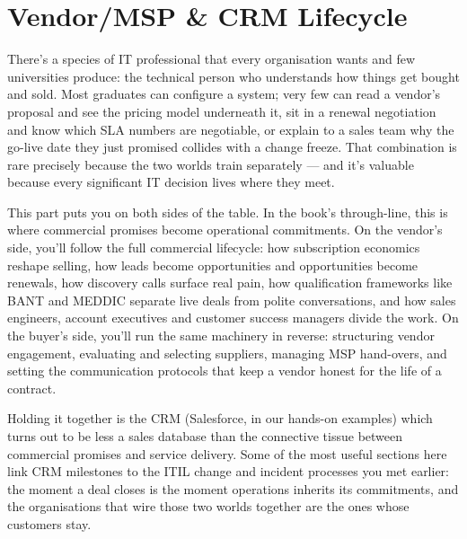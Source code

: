 
\chapter{Vendor/MSP \& CRM Lifecycle}


There's a species of IT professional that every organisation wants and few universities produce: the technical person who understands how things get bought and sold. Most graduates can configure a system; very few can read a vendor's proposal and see the pricing model underneath it, sit in a renewal negotiation and know which SLA numbers are negotiable, or explain to a sales team why the go-live date they just promised collides with a change freeze. That combination is rare precisely because the two worlds train separately — and it's valuable because every significant IT decision lives where they meet.


This part puts you on both sides of the table. In the book's through-line, this is where commercial promises become operational commitments. On the vendor's side, you'll follow the full commercial lifecycle: how subscription economics reshape selling, how leads become opportunities and opportunities become renewals, how discovery calls surface real pain, how qualification frameworks like BANT and MEDDIC separate live deals from polite conversations, and how sales engineers, account executives and customer success managers divide the work. On the buyer's side, you'll run the same machinery in reverse: structuring vendor engagement, evaluating and selecting suppliers, managing MSP hand-overs, and setting the communication protocols that keep a vendor honest for the life of a contract. \autocite{salesforce-sales-process}


Holding it together is the CRM (Salesforce, in our hands-on examples) which turns out to be less a sales database than the connective tissue between commercial promises and service delivery. Some of the most useful sections here link CRM milestones to the ITIL change and incident processes you met earlier: the moment a deal closes is the moment operations inherits its commitments, and the organisations that wire those two worlds together are the ones whose customers stay.


